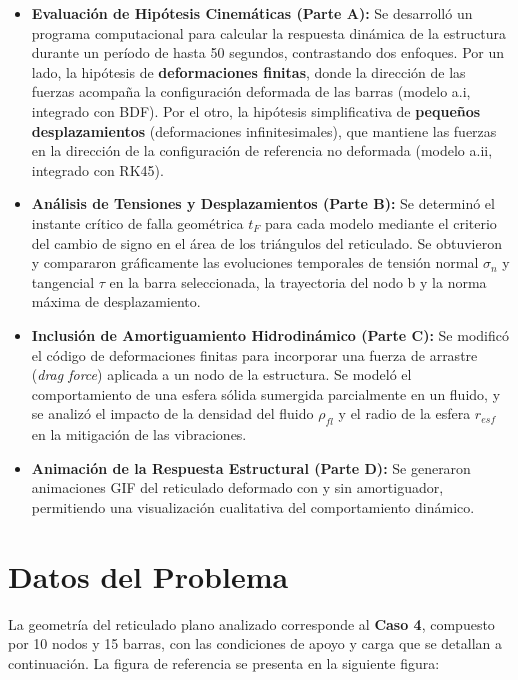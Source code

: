 \documentclass[12pt]{article}
\begin{document}
\begin{itemize}
    \item \textbf{Evaluación de Hipótesis Cinemáticas (Parte A):} Se desarrolló un programa computacional para calcular la respuesta dinámica de la estructura durante un período de hasta 50 segundos, contrastando dos enfoques. Por un lado, la hipótesis de \textbf{deformaciones finitas}, donde la dirección de las fuerzas acompaña la configuración deformada de las barras (modelo a.i, integrado con BDF). Por el otro, la hipótesis simplificativa de \textbf{pequeños desplazamientos} (deformaciones infinitesimales), que mantiene las fuerzas en la dirección de la configuración de referencia no deformada (modelo a.ii, integrado con RK45).

    \item \textbf{Análisis de Tensiones y Desplazamientos (Parte B):} Se determinó el instante crítico de falla geométrica $t_F$ para cada modelo mediante el criterio del cambio de signo en el área de los triángulos del reticulado. Se obtuvieron y compararon gráficamente las evoluciones temporales de tensión normal $\sigma_n$ y tangencial $\tau$ en la barra seleccionada, la trayectoria del nodo b y la norma máxima de desplazamiento.

    \item \textbf{Inclusión de Amortiguamiento Hidrodinámico (Parte C):} Se modificó el código de deformaciones finitas para incorporar una fuerza de arrastre (\textit{drag force}) aplicada a un nodo de la estructura. Se modeló el comportamiento de una esfera sólida sumergida parcialmente en un fluido, y se analizó el impacto de la densidad del fluido $\rho_{fl}$ y el radio de la esfera $r_{esf}$ en la mitigación de las vibraciones.

    \item \textbf{Animación de la Respuesta Estructural (Parte D):} Se generaron animaciones GIF del reticulado deformado con y sin amortiguador, permitiendo una visualización cualitativa del comportamiento dinámico.
\end{itemize}

\section{Datos del Problema}

La geometría del reticulado plano analizado corresponde al \textbf{Caso 4}, compuesto por 10 nodos y 15 barras, con las condiciones de apoyo y carga que se detallan a continuación. La figura de referencia se presenta en la siguiente figura:
\end{document}
